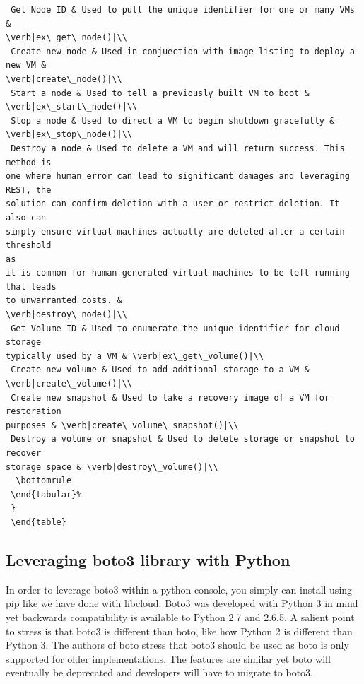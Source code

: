 \begin{verbatim}
 Get Node ID & Used to pull the unique identifier for one or many VMs &
\verb|ex\_get\_node()|\\
 Create new node & Used in conjuection with image listing to deploy a new VM &
\verb|create\_node()|\\
 Start a node & Used to tell a previously built VM to boot &
\verb|ex\_start\_node()|\\
 Stop a node & Used to direct a VM to begin shutdown gracefully &
\verb|ex\_stop\_node()|\\
 Destroy a node & Used to delete a VM and will return success. This method is
one where human error can lead to significant damages and leveraging REST, the
solution can confirm deletion with a user or restrict deletion. It also can
simply ensure virtual machines actually are deleted after a certain threshold
as
it is common for human-generated virtual machines to be left running that leads
to unwarranted costs. &
\verb|destroy\_node()|\\
 Get Volume ID & Used to enumerate the unique identifier for cloud storage
typically used by a VM & \verb|ex\_get\_volume()|\\
 Create new volume & Used to add addtional storage to a VM &
\verb|create\_volume()|\\
 Create new snapshot & Used to take a recovery image of a VM for restoration
purposes & \verb|create\_volume\_snapshot()|\\
 Destroy a volume or snapshot & Used to delete storage or snapshot to recover
storage space & \verb|destroy\_volume()|\\
  \bottomrule
 \end{tabular}%
 }
 \end{table}
\end{verbatim}

\subsection{Leveraging boto3 library with Python}

In order to leverage boto3 within a python console, you simply can install
using
pip like we have done with libcloud. Boto3 was developed with Python 3 in mind
yet backwards compatibility is available to Python 2.7 and 2.6.5. A salient
point to stress is that boto3 is different than boto, like how Python 2 is
different than Python 3. The authors of boto stress that boto3 should be used
as
boto is only supported for older implementations. The features are similar yet
boto will eventually be deprecated and developers will have to migrate to
boto3.~\cite{hid-sp18-518-AWS-boto3}

